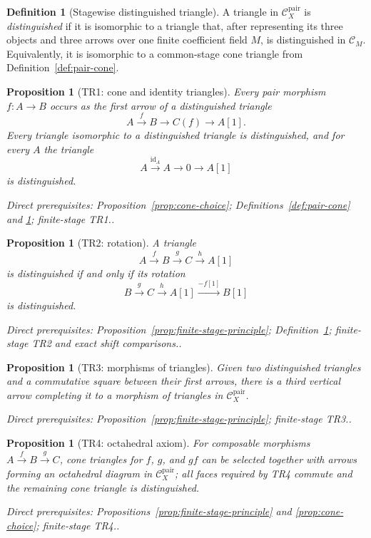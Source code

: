 \documentclass[10pt]{article}
\newtheorem{proposition}[theorem]{Proposition}
\theoremstyle{definition}
\newtheorem{definition}[theorem]{Definition}
\newcommand{\Pair}{\mathcal C_X^{\mathrm{pair}}}
\newcommand{\depends}[1]{\par\smallskip\noindent\textit{Direct prerequisites:} #1.}
\begin{document}
\begin{definition}[Stagewise distinguished triangle]
\label{def:stagewise-triangle}
A triangle in $\Pair$ is \emph{distinguished} if it is isomorphic to a
triangle that, after representing its three objects and three arrows over
one finite coefficient field $M$, is distinguished in $\mathcal C_M$.  Equivalently, it
is isomorphic to a common-stage cone triangle from
Definition~\ref{def:pair-cone}.
\end{definition}

\begin{proposition}[TR1: cone and identity triangles]
\label{prop:pair-tr1}
Every pair morphism $f:A\to B$ occurs as the first arrow of a distinguished
triangle
\[
 A\xrightarrow{f}B\longrightarrow C(f)\longrightarrow A[1].
\]
Every triangle isomorphic to a distinguished triangle is distinguished,
and for every $A$ the triangle
\[
 A\xrightarrow{\operatorname{id}_A}A\longrightarrow0\longrightarrow A[1]
\]
is distinguished.
\depends{Proposition~\ref{prop:cone-choice}; Definitions~\ref{def:pair-cone}
and \ref{def:stagewise-triangle}; finite-stage TR1.}
\end{proposition}

\begin{proposition}[TR2: rotation]\label{prop:pair-tr2}
A triangle
\[
 A\xrightarrow{f}B\xrightarrow{g}C\xrightarrow{h}A[1]
\]
is distinguished if and only if its rotation
\[
 B\xrightarrow{g}C\xrightarrow{h}A[1]
 \xrightarrow{-f[1]}B[1]
\]
is distinguished.
\depends{Proposition~\ref{prop:finite-stage-principle};
Definition~\ref{def:stagewise-triangle}; finite-stage TR2 and exact shift
comparisons.}
\end{proposition}

\begin{proposition}[TR3: morphisms of triangles]\label{prop:pair-tr3}
Given two distinguished triangles and a commutative square between their
first arrows, there is a third vertical arrow completing it to a morphism of
triangles in $\Pair$.
\depends{Proposition~\ref{prop:finite-stage-principle}; finite-stage TR3.}
\end{proposition}

\begin{proposition}[TR4: octahedral axiom]\label{prop:pair-tr4}
For composable morphisms $A\xrightarrow{f}B\xrightarrow{g}C$, cone triangles
for $f$, $g$, and $gf$ can be selected together with arrows forming an
octahedral diagram in $\Pair$; all faces required by TR4 commute and the
remaining cone triangle is distinguished.
\depends{Propositions~\ref{prop:finite-stage-principle} and
\ref{prop:cone-choice}; finite-stage TR4.}
\end{proposition}
\end{document}

